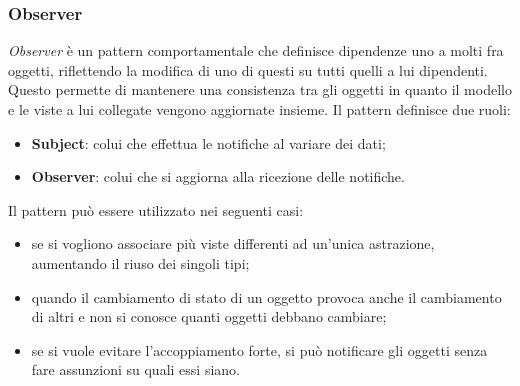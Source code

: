 \subsubsection{Observer}
\textit{Observer} è un pattern comportamentale che definisce dipendenze uno a molti fra oggetti, riflettendo la modifica di uno di questi su tutti quelli a lui dipendenti. Questo permette di mantenere una consistenza tra gli oggetti in quanto il modello e le viste a lui collegate vengono aggiornate insieme. 
Il pattern definisce due ruoli:
\begin{itemize}
	\item \textbf{Subject}: colui che effettua le notifiche al variare dei dati;
	\item \textbf{Observer}: colui che si aggiorna alla ricezione delle notifiche.
\end{itemize}
Il pattern può essere utilizzato nei seguenti casi:
\begin{itemize}
	\item se si vogliono associare più viste differenti ad un'unica astrazione, aumentando il riuso dei singoli tipi;
	\item quando il cambiamento di stato di un oggetto provoca anche il cambiamento di altri e non si conosce quanti oggetti debbano cambiare;
	\item se si vuole evitare l'accoppiamento forte, si può notificare gli oggetti senza fare assunzioni su quali essi siano.
\end{itemize}